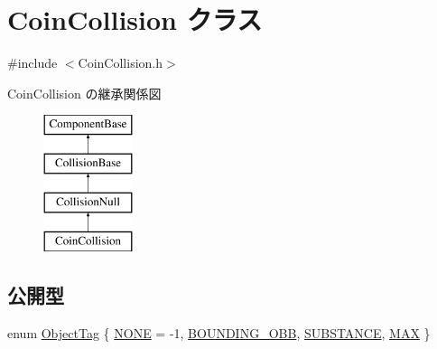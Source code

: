 \hypertarget{class_coin_collision}{}\section{Coin\+Collision クラス}
\label{class_coin_collision}


{\ttfamily \#include $<$Coin\+Collision.\+h$>$}

Coin\+Collision の継承関係図\begin{figure}[H]
\begin{center}
\leavevmode
\includegraphics[height=4.000000cm]{class_coin_collision}
\end{center}
\end{figure}
\subsection*{公開型}
\begin{DoxyCompactItemize}
\item 
enum \mbox{\hyperlink{class_coin_collision_ade7912345747f522fd895e87621ce049}{Object\+Tag}} \{ \mbox{\hyperlink{class_coin_collision_ade7912345747f522fd895e87621ce049aa520033eb3664c6f516082c22efd5d17}{N\+O\+NE}} = -\/1, 
\mbox{\hyperlink{class_coin_collision_ade7912345747f522fd895e87621ce049a003d6865c3e811586f2b96d25c4b6375}{B\+O\+U\+N\+D\+I\+N\+G\+\_\+\+O\+BB}}, 
\mbox{\hyperlink{class_coin_collision_ade7912345747f522fd895e87621ce049ab3dfdeacfa9cf71c167dfb2faec4612f}{S\+U\+B\+S\+T\+A\+N\+CE}}, 
\mbox{\hyperlink{class_coin_collision_ade7912345747f522fd895e87621ce049afe668be7d8cc9606f4c5be2220c38281}{M\+AX}}
 \}
\end{DoxyCompactItemize}
